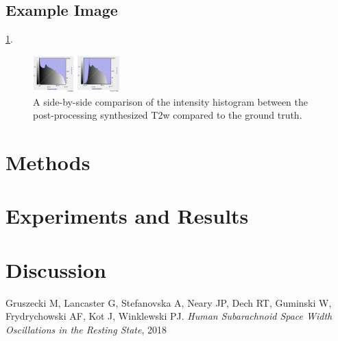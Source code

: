 \documentclass[conference]{IEEEtran}
\begin{document}
\subsection{Example Image}
\lipsum[7] \ref{fig:example}.
\begin{figure}[h!]
    \centering
    \includegraphics[width=0.30\textwidth]{Histogram Comparison.png}
    \caption{A side-by-side comparison of the intensity histogram between the post-processing synthesized T2w compared to the ground truth.}
    \label{fig:example}
\end{figure}

\section{Methods}
\lipsum[8]

\section{Experiments and Results}
\lipsum[9]

\section{Discussion}
\lipsum[10]

\begin{thebibliography}{1}
Gruszecki M, Lancaster G, Stefanovska A, Neary JP, Dech RT, Guminski W, Frydrychowski AF, Kot J, Winklewski PJ. \emph{Human Subarachnoid Space Width Oscillations in the Resting State}, 2018
\end{thebibliography}
\end{document}
